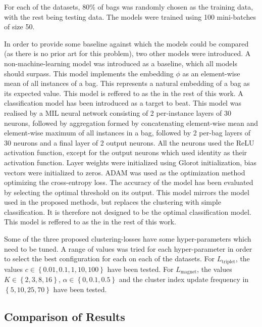 For each of the datasets, 80\% of bags was randomly chosen as the training data, with the rest being testing data. The models were trained using 100 mini-batches of size 50.

In order to provide some baseline against which the models could be compared (as there is no prior art for this problem), two other models were introduced. A non-machine-learning model was introduced as a baseline, which all models should surpass. This model implements the embedding \( \phi \) as an element-wise mean of all instances of a bag. This represents a natural embedding of a bag as its expected value. This model is reffered to as the  in the rest of this work. A classification model has been introduced as a target to beat. This model was realised by a MIL neural network consisting of 2 per-instance layers of 30 neurons, followed by aggregation formed by concatenating element-wise mean and element-wise maximum of all instances in a bag, followed by 2 per-bag layers of 30 neurons and a final layer of 2 output neurons. All the neurons used the ReLU activation function, except for the output neurons which used identity as their activation function. Layer weights were initialized using Glorot initialization, bias vectors were initialized to zeros. ADAM was used as the optimization method optimizing the cross-entropy loss. The accuracy of the model has been evaluated by selecting the optimal threshold on its output. This model mirrors the model used in the proposed methods, but replaces the clustering with simple classification. It is therefore not designed to be the optimal classification model. This model is reffered to as the  in the rest of this work.

Some of the three proposed clustering-losses have some hyper-parameters which need to be tuned. A range of values was tried for each hyper-parameter in order to select the best configuration for each on each of the datasets. For \( L_\mathrm{triplet} \), the values \( c \in \left\{ 0.01, 0.1, 1, 10, 100 \right\} \) have been tested. For \( L_\mathrm{magnet} \), the values \( K \in \left\{ 2, 3, 8, 16 \right\} \), \( \alpha \in \left\{ 0, 0.1, 0.5 \right\} \) and the cluster index update frequency in \( \left\{ 5, 10, 25, 70 \right\} \) have been tested.

\subsection{Comparison of Results}\label{sec:experiment-comparison}


